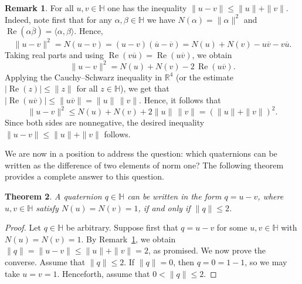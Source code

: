 \documentclass[11pt]{article}
\newtheorem{theorem}{Theorem}
\theoremstyle{definition}
\newtheorem{remark}[theorem]{Remark}%
\begin{document}
{{{{				\begin{remark}\label{uv}
					For all $u,v \in \mathbb{H}$ one has the inequality $\|u - v\| \le \|u\| + \|v\|$.
					Indeed, note first that for any $\alpha,\beta \in \mathbb{H}$ we have $N(\alpha) = \|\alpha\|^2$ and
					$\operatorname{Re}(\alpha \overline{\beta}) = \langle \alpha,\beta \rangle$. Hence,
					$$\|u - v\|^2 = N(u - v)
					= (u - v)(\overline{u} - \overline{v})
					= N(u) + N(v) - u\overline{v} - v\overline{u}.$$
					Taking real parts and using $\operatorname{Re}(v\overline{u}) = \operatorname{Re}(u\overline{v})$, we obtain
					$$\|u - v\|^2 = N(u) + N(v) - 2\,\operatorname{Re}(u\overline{v}).$$
					Applying the Cauchy--Schwarz inequality in $\mathbb{R}^4$ (or the estimate
					$|\operatorname{Re}(z)| \le \|z\|$ for all $z \in \mathbb{H}$), we get that $|\operatorname{Re}(u\overline{v})| \le \|u\overline{v}\| = \|u\|\,\|v\|.$
					Hence, it follows that
					$$\|u - v\|^2 \le N(u) + N(v) + 2\|u\|\,\|v\|
					= (\|u\| + \|v\|)^2.$$
					Since both sides are nonnegative, the desired inequality $\|u - v\| \le \|u\| + \|v\|$ follows.
				\end{remark}
				
				We are now in a position to address the  question: which quaternions can be written as the difference of two elements of norm one? The following theorem provides a complete answer to this question.
				
				\begin{theorem}\label{qu}
					A quaternion $q \in \mathbb{H}$ can be written in the form $q = u - v$, where
					$u, v \in \mathbb{H}$ satisfy $N(u) = N(v) = 1$, if and only if $\|q\| \le 2$.
				\end{theorem}
				
				
				\begin{proof}
					Let $q \in \mathbb{H}$ be arbitrary. Suppose first that $q = u - v$ for some
					$u, v \in \mathbb{H}$ with $N(u) = N(v) = 1$. By Remark~\ref{uv}, we obtain $\|q\| = \|u - v\| \le \|u\| + \|v\| = 2$, as promised. We now prove the converse. Assume that $\|q\| \le 2$. If $\|q\| = 0$, then
					$q = 0 = 1 - 1$, so we may take $u = v = 1$. Henceforth, assume that
					$0 < \|q\| \le 2$.
					

\end{proof}}}}}
\end{document}
